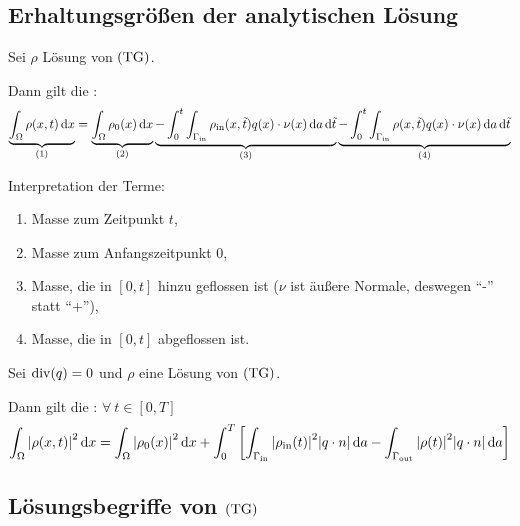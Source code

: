 \newpage
\subsection{Erhaltungsgrößen der analytischen Lösung}
\label{subsec:Erhaltungsgroessen der analytischen Loesung}
\begin{Lemma}[Massenbilanz]
	\label{Massenbilanz}
	
	Sei $ \rho $ Lösung von $ \operatorname{(TG)} $. 
	
	Dann gilt die :
	\[ \underbrace{\int_{\Omega} \rho(x,t) \mathop{}\!\mathrm{d} x}_{(1)} = \underbrace{\int_{\Omega} \rho_0(x) \mathop{}\!\mathrm{d} x}_{(2)}  \underbrace{-\int_{0}^{t} \int_{\Gamma_{{\text{in}}}} \rho_{\text{in}}(x,\tilde{t}) q(x) \cdot \nu(x) \mathop{}\!\mathrm{d} a \mathop{}\!\mathrm{d} \tilde{t}}_{(3)} \underbrace{- \int_{0}^{t} \int_{\Gamma_{{\text{in}}}} \rho(x,\tilde{t}) q(x) \cdot \nu(x) \mathop{}\!\mathrm{d} a \mathop{}\!\mathrm{d} \tilde{t}}_{(4)} \]
\end{Lemma}
	Interpretation der Terme:
	\begin{enumerate}[label=(\arabic*)]
		\item Masse zum Zeitpunkt $ t $,
		\item Masse zum Anfangszeitpunkt $ 0 $,
		\item Masse, die in $ [0,t] $ hinzu geflossen ist ($ \nu $ ist äußere Normale, deswegen \enquote{-} statt \enquote{+}),
		\item Masse, die in $ [0,t] $ abgeflossen ist.
	\end{enumerate}

\begin{Lemma}[Energiebilanz]
	\label{Energiegleichung}
	
	Sei $ \operatorname{div}(q) = 0 $ und $ \rho $ eine Lösung von $ \operatorname{(TG)} $. 
	
	Dann gilt die : $ \forall \ t\in [0,T] $
	\[\int_{\Omega} \abs{\rho(x,t)}^2 \mathop{}\!\mathrm{d} x = \int_{\Omega} \abs{\rho_0(x)}^2 \mathop{}\!\mathrm{d} x  + \int_{0}^{T} \left[ \int_{\Gamma_{{\text{in}}}}\abs{\rho_{\text{in}}(t)}^2 \abs{q\cdot n} \mathop{}\!\mathrm{d} a - \int_{\Gamma_{{\text{out}}}} \abs{\rho(t)}^2 \abs{q\cdot n} \mathop{}\!\mathrm{d} a  \right] \]
\end{Lemma}

\subsection{Lösungsbegriffe von $ \operatorname{(TG)} $}

